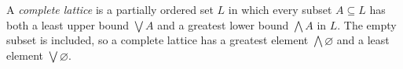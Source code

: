 
A \emph{complete lattice} is a partially ordered set $L$ in which every subset $A\subseteq L$ has both a least upper bound $\bigvee A$ and a greatest lower bound $\bigwedge A$ in $L$. The empty subset is included, so a complete lattice has a greatest element $\bigwedge\varnothing$ and a least element $\bigvee\varnothing$.
